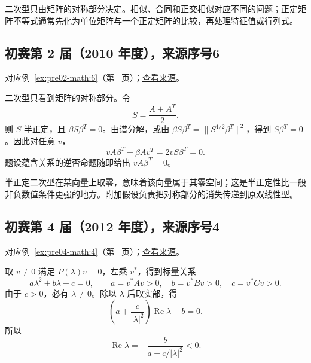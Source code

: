 \documentclass[12pt,fontset=fandol]{ctexart}
\begin{document}
二次型只由矩阵的对称部分决定。相似、合同和正交相似对应不同的问题；正定矩阵不等式通常先化为单位矩阵与一个正定矩阵的比较，再处理特征值或行列式。

\subsection{初赛第 2 届（2010 年度），来源序号6}\label{ans:pre02-math:6}\label{pr:pre02-math:6}

对应例~\ref{ex:pre02-math:6}（第~\pageref{ex:pre02-math:6} 页）；\href{https://github.com/lzxcr/cmc-mathematics/blob/64916fa1fdbc3e444a652eca204d5669058ee321/src/problems/preliminary/02/06.md}{查看来源}。

\begin{solve}

二次型只看到矩阵的对称部分。令
\[
S=\frac{A+A^T}{2}.
\]
则 $S$ 半正定，且 $\beta S\beta^T=0$。由谱分解，或由 $\beta S\beta^T=\|S^{1/2}\beta^T\|^2$，得到 $S\beta^T=0$。因此对任意 $v$，
\[
vA\beta^T+\beta Av^T=2vS\beta^T=0.
\]
题设蕴含关系的逆否命题随即给出 $vA\beta^T=0$。

\end{solve}

\begin{remark}[方法与条件]

半正定二次型在某向量上取零，意味着该向量属于其零空间；这是半正定性比一般非负数值条件更强的地方。附加假设负责把对称部分的消失传递到原双线性型。

\end{remark}

\subsection{初赛第 4 届（2012 年度），来源序号4}\label{ans:pre04-math:4}\label{pr:pre04-math:4}

对应例~\ref{ex:pre04-math:4}（第~\pageref{ex:pre04-math:4} 页）；\href{https://github.com/lzxcr/cmc-mathematics/blob/64916fa1fdbc3e444a652eca204d5669058ee321/src/problems/preliminary/04/04.md}{查看来源}。

\begin{solve}

取 $v\ne0$ 满足 $P(\lambda)v=0$，左乘 $v^*$，得到标量关系
\[
a\lambda^2+b\lambda+c=0,
\qquad a=v^*Av>0,\quad b=v^*Bv>0,\quad c=v^*Cv>0.
\]
由于 $c>0$，必有 $\lambda\ne0$。除以 $\lambda$ 后取实部，得
\[
\left(a+\frac{c}{|\lambda|^2}\right)\operatorname{Re}\lambda+b=0.
\]
所以
\[
\operatorname{Re}\lambda
=-\frac{b}{a+c/|\lambda|^2}<0.
\]

\end{solve}
\end{document}
